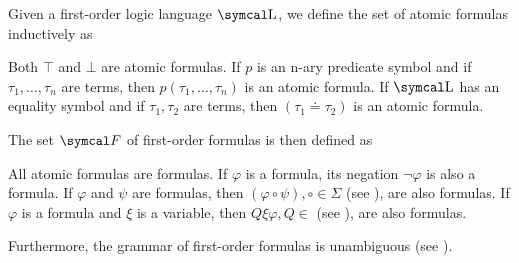 \begin{definition}
  Given a first-order logic language \( \CL \), we define the set of atomic formulas inductively as
  \begin{itemize}
     Both \( \top \) and \( \bot \) are atomic formulas.
     If \( p \) is an n-ary predicate symbol and if \( \tau_1, \ldots, \tau_n \) are terms, then \( p(\tau_1, \ldots, \tau_n) \) is an atomic formula.
     If \( \CL \) has an equality symbol and if \( \tau_1, \tau_2 \) are terms, then \( (\tau_1 \doteq \tau_2) \) is an atomic formula.
  \end{itemize}

  The set \( \Cal{F} \) of first-order formulas is then defined as
  \begin{itemize}
     All atomic formulas are formulas.
     If \( \varphi \) is a formula, its negation \( \neg \varphi \) is also a formula.
     If \( \varphi \) and \( \psi \) are formulas, then \( (\varphi \circ \psi), \circ \in \Sigma \) (see ), are also formulas.
     If \( \varphi \) is a formula and \( \xi \) is a variable, then \( Q \xi \varphi, Q \in  \) (see ), are also formulas.
  \end{itemize}

  Furthermore, the grammar of first-order formulas is unambiguous (see ).


\end{definition}
